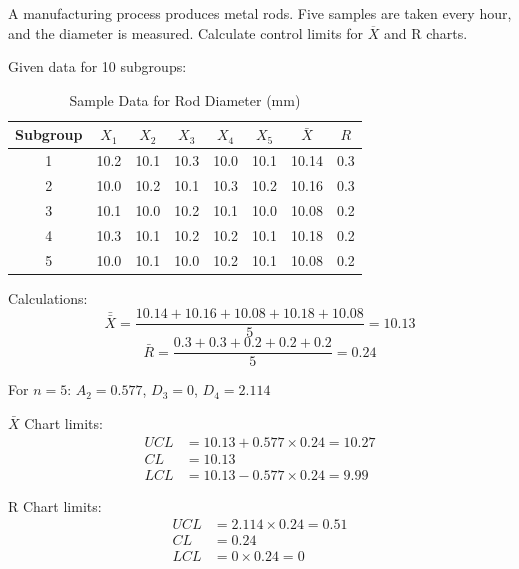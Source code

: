 \documentclass[twoside]{book}
\begin{document}
A manufacturing process produces metal rods. Five samples are taken every hour, and the diameter is measured. Calculate control limits for $\overline{X}$ and R charts.

Given data for 10 subgroups:
\begin{table}[H]
\centering
\caption{Sample Data for Rod Diameter (mm)}
\begin{tabular}{c|ccccc|c|c}
\toprule
\textbf{Subgroup} & $X_1$ & $X_2$ & $X_3$ & $X_4$ & $X_5$ & $\bar{X}$ & $R$ \\
\midrule
1 & 10.2 & 10.1 & 10.3 & 10.0 & 10.1 & 10.14 & 0.3 \\
2 & 10.0 & 10.2 & 10.1 & 10.3 & 10.2 & 10.16 & 0.3 \\
3 & 10.1 & 10.0 & 10.2 & 10.1 & 10.0 & 10.08 & 0.2 \\
4 & 10.3 & 10.1 & 10.2 & 10.2 & 10.1 & 10.18 & 0.2 \\
5 & 10.0 & 10.1 & 10.0 & 10.2 & 10.1 & 10.08 & 0.2 \\
\bottomrule
\end{tabular}
\end{table}

Calculations:
$$\bar{\bar{X}} = \frac{10.14 + 10.16 + 10.08 + 10.18 + 10.08}{5} = 10.13$$
$$\bar{R} = \frac{0.3 + 0.3 + 0.2 + 0.2 + 0.2}{5} = 0.24$$

For $n = 5$: $A_2 = 0.577$, $D_3 = 0$, $D_4 = 2.114$

$\bar{X}$ Chart limits:
\begin{align}
UCL &= 10.13 + 0.577 \times 0.24 = 10.27\\
CL &= 10.13\\
LCL &= 10.13 - 0.577 \times 0.24 = 9.99
\end{align}

R Chart limits:
\begin{align}
UCL &= 2.114 \times 0.24 = 0.51\\
CL &= 0.24\\
LCL &= 0 \times 0.24 = 0
\end{align}
\end{document}
